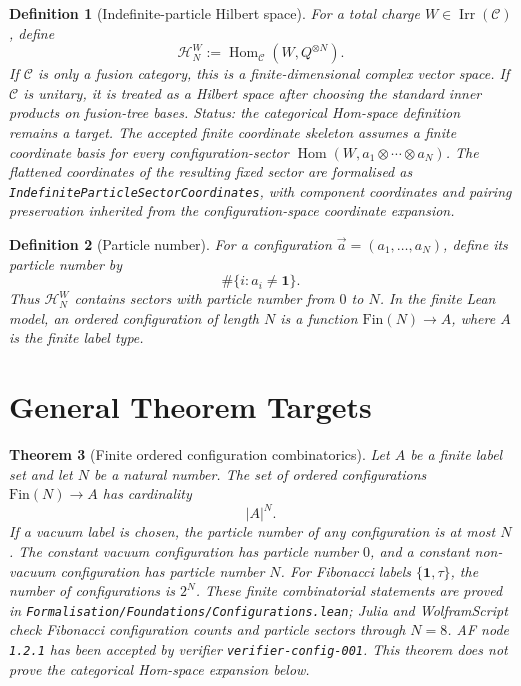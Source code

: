 \documentclass[11pt]{article}
\newtheorem{definition}{Definition}[section]
\newtheorem{theorem}[definition]{Theorem}
\DeclareMathOperator{\Hom}{Hom}
\DeclareMathOperator{\Irr}{Irr}
\begin{document}
\begin{definition}[Indefinite-particle Hilbert space]
For a total charge \(W\in\Irr(\mathcal C)\), define
\[
\mathcal H_N^W:=\Hom_{\mathcal C}(W,Q^{\otimes N}).
\]
If \(\mathcal C\) is only a fusion category, this is a finite-dimensional
complex vector space. If \(\mathcal C\) is unitary, it is treated as a Hilbert
space after choosing the standard inner products on fusion-tree bases.
Status: the categorical Hom-space definition remains a target. The accepted
finite coordinate skeleton assumes a finite coordinate basis for every
configuration-sector \(\Hom(W,a_1\otimes\cdots\otimes a_N)\). The flattened
coordinates of the resulting fixed sector are formalised as
\texttt{IndefiniteParticleSectorCoordinates}, with component coordinates and
pairing preservation inherited from the configuration-space coordinate
expansion.
\end{definition}

\begin{definition}[Particle number]
For a configuration \(\vec a=(a_1,\ldots,a_N)\), define its particle number by
\[
\#\{i:a_i\ne \mathbf 1\}.
\]
Thus \(\mathcal H_N^W\) contains sectors with particle number from \(0\) to
\(N\). In the finite Lean model, an ordered configuration of length \(N\) is a
function \(\mathrm{Fin}(N)\to A\), where \(A\) is the finite label type.
\end{definition}

\section{General Theorem Targets}

\begin{theorem}[Finite ordered configuration combinatorics]
Let \(A\) be a finite label set and let \(N\) be a natural number. The set of
ordered configurations \(\mathrm{Fin}(N)\to A\) has cardinality
\[
|A|^N.
\]
If a vacuum label is chosen, the particle number of any configuration is at
most \(N\). The constant vacuum configuration has particle number \(0\), and a
constant non-vacuum configuration has particle number \(N\). For Fibonacci
labels \(\{\mathbf 1,\tau\}\), the number of configurations is \(2^N\).
These finite combinatorial statements are proved in
\texttt{Formalisation/Foundations/Configurations.lean}; Julia and
WolframScript check Fibonacci configuration counts and particle sectors through
\(N=8\). AF node \texttt{1.2.1} has been accepted by verifier
\texttt{verifier-config-001}. This theorem does not prove the categorical
Hom-space expansion below.
\end{theorem}
\end{document}
